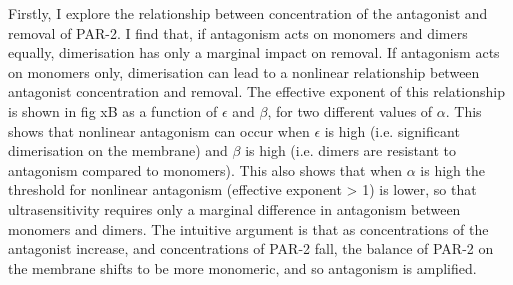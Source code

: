 \documentclass[12pt]{"report"}
\begin{document}
Firstly, I explore the relationship between concentration of the antagonist and removal of PAR-2. I find that, if antagonism acts on monomers and dimers equally, dimerisation has only a marginal impact on removal. If antagonism acts on monomers only, dimerisation can lead to a nonlinear relationship between antagonist concentration and removal. The effective exponent of this relationship is shown in fig xB as a function of $\epsilon$ and $\beta$, for two different values of $\alpha$. This shows that nonlinear antagonism can occur when $\epsilon$ is high (i.e. significant dimerisation on the membrane) and $\beta$ is high (i.e. dimers are resistant to antagonism compared to monomers). This also shows that when $\alpha$ is high the threshold for nonlinear antagonism (effective exponent > 1) is lower, so that ultrasensitivity requires only a marginal difference in antagonism between monomers and dimers. The intuitive argument is that as concentrations of the antagonist increase, and concentrations of PAR-2 fall, the balance of PAR-2 on the membrane shifts to be more monomeric, and so antagonism is amplified.\\
\end{document}
